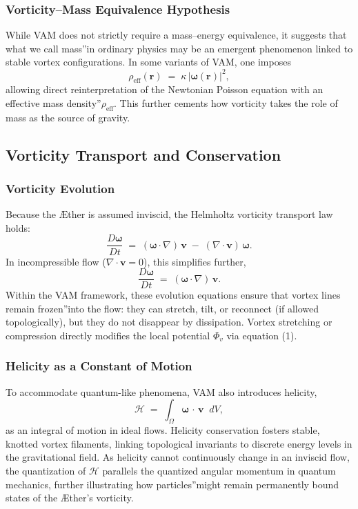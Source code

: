 \documentclass[a4paper,12pt]{article}
\begin{document}
\subsubsection{Vorticity–Mass Equivalence Hypothesis}

While VAM does not strictly require a mass–energy equivalence, it suggests that what we call \grqq mass\textquotedblright in ordinary physics may be an emergent phenomenon linked to stable vortex configurations. In some variants of VAM, one imposes
\[
    \rho_{\mathrm{eff}}(\mathbf{r}) \;=\; \kappa \,\lvert \boldsymbol{\omega}(\mathbf{r}) \rvert^2,
\]
allowing direct reinterpretation of the Newtonian Poisson equation with an \grqq effective mass density\textquotedblright \(\rho_{\mathrm{eff}}\). This further cements how vorticity takes the role of mass as the source of gravity.

\subsection{Vorticity Transport and Conservation}

\subsubsection{Vorticity Evolution}

Because the Æther is assumed inviscid, the Helmholtz vorticity transport law holds:
\[
    \frac{D \boldsymbol{\omega}}{Dt}
    \;=\;
    (\boldsymbol{\omega} \cdot \nabla)\,\mathbf{v}
    \;-\;
    (\nabla \cdot \mathbf{v})\,\boldsymbol{\omega}.
\]
In incompressible flow (\(\nabla \cdot \mathbf{v} = 0\)), this simplifies further,
\[
    \frac{D \boldsymbol{\omega}}{Dt}
    \;=\;
    (\boldsymbol{\omega} \cdot \nabla)\,\mathbf{v}.
\]
Within the VAM framework, these evolution equations ensure that vortex lines remain \grqq frozen\textquotedblright into the flow: they can stretch, tilt, or reconnect (if allowed topologically), but they do not disappear by dissipation. Vortex stretching or compression directly modifies the local potential \(\Phi_v\) via equation (1).

\subsubsection{Helicity as a Constant of Motion}

To accommodate quantum-like phenomena, VAM also introduces helicity,
\[
    \mathcal{H} \;=\; \int_{\Omega} \boldsymbol{\omega} \,\cdot\, \mathbf{v} \;\;dV,
\]
as an integral of motion in ideal flows. Helicity conservation fosters stable, knotted vortex filaments, linking topological invariants to discrete energy levels in the gravitational field. As helicity cannot continuously change in an inviscid flow, the quantization of \(\mathcal{H}\) parallels the quantized angular momentum in quantum mechanics, further illustrating how \grqq particles\textquotedblright might remain permanently bound states of the Æther's vorticity.
\end{document}
